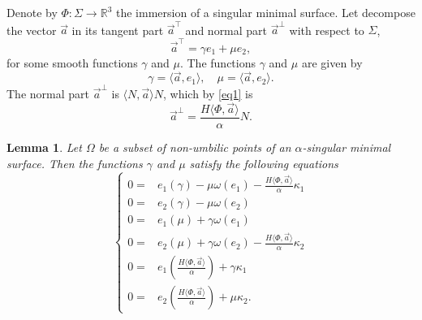 \documentclass{birkjour}
\newtheorem{lem}[thm]{Lemma}
\theoremstyle{definition}
\theoremstyle{remark}
\numberwithin{equation}{section}
\def\r{\mathbb R}
\begin{document}
 Denote by $\Phi\colon\Sigma\to\r^3$ the immersion of  a singular minimal surface. Let  decompose the  vector $\vec{a}$ in its tangent part $\vec{a}^\top$ and normal part $\vec{a}^\perp$ with respect to $\Sigma$,  
\begin{equation*}
\vec{a}^\top=\gamma e_1+\mu e_2,
\end{equation*}
for some smooth functions $\gamma$ and $\mu$. The functions $\gamma$ and $\mu$ are given by 
$$\gamma=\langle \vec{a},e_1\rangle,\quad \mu=\langle\vec{a},e_2\rangle.$$
 The normal part $\vec{a}^\perp$  is   $\langle N,\vec{a}\rangle N$, which by \eqref{eq1} is
$$\vec{a}^{\perp}=\frac{H\langle\Phi,\vec{a}\rangle}{\alpha}N.$$
\begin{lem}\label{l2}
Let $\Omega$ be a subset of non-umbilic points of an $\alpha$-singular minimal surface. Then the functions   $\gamma$ and $\mu$ satisfy the following equations
    \begin{equation}\label{d3}
    \left\{
\begin{split}
            0=&e_{1}(\gamma)-\mu\omega(e_1)-\frac{H\langle\Phi,\vec{a}\rangle}{\alpha}\kappa_1\\
            0=&e_{2}(\gamma)-\mu\omega(e_2) \\
            0=&e_{1}(\mu)+\gamma\omega(e_1)\\
           0= &e_{2}(\mu)+\gamma\omega(e_2)-\frac{H\langle\Phi,\vec{a}\rangle}{\alpha}\kappa_2\\
           0= &e_{1}(\frac{H\langle\Phi,\vec{a}\rangle}{\alpha})+\gamma\kappa_1\\
           0= &e_{2}(\frac{H\langle\Phi,\vec{a}\rangle}{\alpha})+\mu\kappa_2.
        \end{split}\right.
    \end{equation}
\end{lem}
\end{document}
